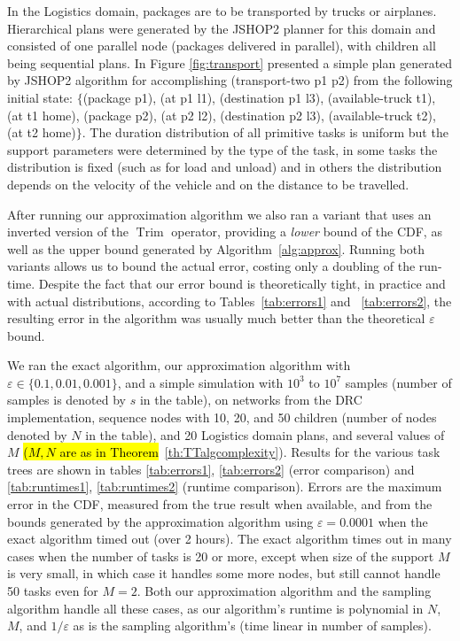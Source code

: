 \documentclass{article}
\DeclareMathOperator{\Trim}{Trim}
\begin{document}
In the Logistics domain, packages are to be transported by trucks or airplanes.
Hierarchical plans were generated by the JSHOP2 planner \cite{nau2003shop2} for this domain and consisted of one parallel node (packages delivered in parallel),
with children all being sequential plans. In Figure {\ref{fig:transport}} presented a simple plan generated by JSHOP2 algorithm for accomplishing (transport-two p1 p2) from the following initial state: $\{$(package p1), (at p1 l1), (destination p1 l3), (available-truck t1), (at t1 home),
(package p2), (at p2 l2), (destination p2 l3), (available-truck t2), (at t2 home)$\}$.
The duration distribution of all primitive tasks is uniform but the support parameters were determined by the type of the task, 
in some tasks the distribution is fixed (such as for load and unload) and in others the distribution depends on the velocity of the vehicle
and on the distance to be travelled.

After running our approximation algorithm we also ran a variant
that uses an inverted version of the $\Trim$ operator, providing a {\em lower} bound of the CDF, as well as the upper bound
generated by Algorithm~\ref{alg:approx}. Running both variants allows us to bound the actual error, costing
only a doubling of the run-time. Despite the fact that our error bound is theoretically tight, in practice
and with actual distributions, according to Tables~\ref{tab:errors1} and ~\ref{tab:errors2}, the resulting error
in the algorithm was usually much better than the theoretical $\varepsilon$ bound.


We ran the exact algorithm, our approximation algorithm with $\varepsilon \in \{ 0.1, 0.01, 0.001\}$, and a simple simulation with 
$10^3$ to $10^7$ samples (number of samples is denoted by $s$ in the table), on networks from the DRC
implementation, sequence nodes with 10, 20, and 50 children (number of nodes denoted by $N$ in the table), and 20 Logistics domain plans, and
several values of $M$ \hl{($M, N$ are as in Theorem}~\ref{th:TTalgcomplexity}). 
Results for the various task trees are shown in tables \ref{tab:errors1}, \ref{tab:errors2} (error comparison) and \ref{tab:runtimes1}, \ref{tab:runtimes2} (runtime comparison).
Errors are the maximum error in the CDF, measured from the true result when available, and from the bounds generated by the approximation algorithm using $\varepsilon = 0.0001$
when the exact algorithm timed out (over 2 hours). 
The exact algorithm times out in many cases when the number of tasks is 20 or more, except when size of the support $M$ is very small, in which case it handles some more nodes, but still cannot handle 
50 tasks even for $M=2$.
Both our approximation algorithm and the sampling algorithm handle all these cases, as our algorithm's runtime is polynomial in $N$, $M$, and ${1}/{\varepsilon}$
as is the sampling algorithm's (time linear in number of samples). 
\end{document}
